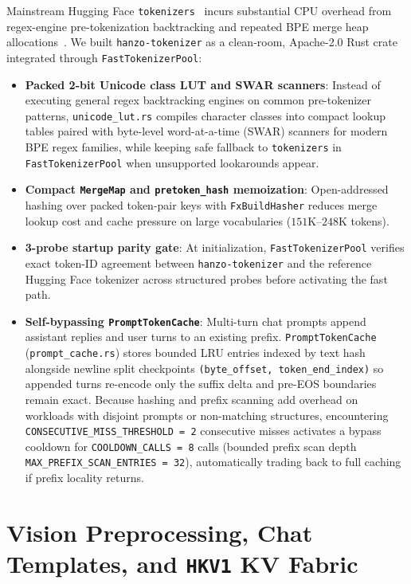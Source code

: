 \documentclass[11pt,a4paper]{article}
\begin{document}
Mainstream Hugging Face \texttt{tokenizers}~\cite{huggingface2024tokenizers} incurs substantial CPU overhead from regex-engine pre-tokenization backtracking and repeated BPE merge heap allocations~\cite{gage1994bpe}. We built \texttt{hanzo-tokenizer} as a clean-room, Apache-2.0 Rust crate integrated through \texttt{FastTokenizerPool}:
\begin{itemize}[noitemsep]
  \item \textbf{Packed 2-bit Unicode class LUT and SWAR scanners}: Instead of executing general regex backtracking engines on common pre-tokenizer patterns, \texttt{unicode\_lut.rs} compiles character classes into compact lookup tables paired with byte-level word-at-a-time (SWAR) scanners for modern BPE regex families, while keeping safe fallback to \texttt{tokenizers} in \texttt{FastTokenizerPool} when unsupported lookarounds appear.
  \item \textbf{Compact \texttt{MergeMap} and \texttt{pretoken\_hash} memoization}: Open-addressed hashing over packed token-pair keys with \texttt{FxBuildHasher} reduces merge lookup cost and cache pressure on large vocabularies ($151\text{K}$--$248\text{K}$ tokens).
  \item \textbf{3-probe startup parity gate}: At initialization, \texttt{FastTokenizerPool} verifies exact token-ID agreement between \texttt{hanzo-tokenizer} and the reference Hugging Face tokenizer across structured probes before activating the fast path.
  \item \textbf{Self-bypassing \texttt{PromptTokenCache}}: Multi-turn chat prompts append assistant replies and user turns to an existing prefix. \texttt{PromptTokenCache} (\texttt{prompt\_cache.rs}) stores bounded LRU entries indexed by text hash alongside newline split checkpoints \texttt{(byte\_offset, token\_end\_index)} so appended turns re-encode only the suffix delta and pre-EOS boundaries remain exact. Because hashing and prefix scanning add overhead on workloads with disjoint prompts or non-matching structures, encountering \texttt{CONSECUTIVE\_MISS\_THRESHOLD = 2} consecutive misses activates a bypass cooldown for \texttt{COOLDOWN\_CALLS = 8} calls (bounded prefix scan depth \texttt{MAX\_PREFIX\_SCAN\_ENTRIES = 32}), automatically trading back to full caching if prefix locality returns.
\end{itemize}

\section{Vision Preprocessing, Chat Templates, and \texttt{HKV1} KV Fabric}
\end{document}
